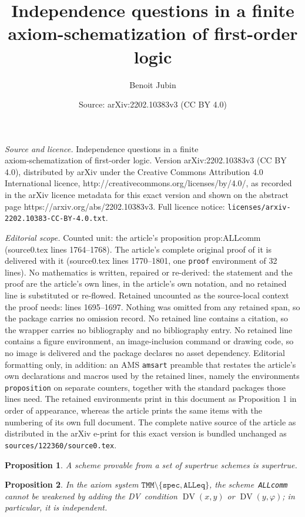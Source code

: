 \documentclass[10pt,a4paper]{amsart}
\title{Independence questions in a finite\\axiom-schematization of first-order logic}
\author{Benoit Jubin}
\date{Source: arXiv:2202.10383v3 (CC BY 4.0)}
\newtheorem{proposition}{Proposition}
\DeclareMathOperator{\DV}{DV}
\renewcommand*{\phi}{\varphi}
\begin{document}
\maketitle

\noindent\emph{Source and licence.} Independence questions in a finite\\axiom-schematization of first-order logic. Version arXiv:2202.10383v3 (CC BY 4.0), distributed by arXiv under the Creative Commons Attribution 4.0 International licence, http://creativecommons.org/licenses/by/4.0/, as recorded in the arXiv licence metadata for this exact version and shown on the abstract page https://arxiv.org/abs/2202.10383v3. Full licence notice: \texttt{licenses/arxiv-2202.10383-CC-BY-4.0.txt}.\par\smallskip

\noindent\textit{Editorial scope.} Counted unit: the article's proposition prop:ALLcomm (source0.tex lines 1764--1768). The article's complete original proof of it is delivered with it (source0.tex lines 1770--1801, one \texttt{proof} environment of 32 lines). No mathematics is written, repaired or re-derived: the statement and the proof are the article's own lines, in the article's own notation, and no retained line is substituted or re-flowed.  Retained uncounted as the source-local context the proof needs: lines 1695--1697.  Nothing was omitted from any retained span, so the package carries no omission record.  No retained line contains a citation, so the wrapper carries no bibliography and no bibliography entry.  No retained line contains a figure environment, an image-inclusion command or drawing code, so no image is delivered and the package declares no asset dependency.  Editorial formatting only, in addition: an AMS \texttt{amsart} preamble that restates the article's own declarations and macros used by the retained lines, namely the environments \texttt{proposition} on separate counters, together with the standard packages those lines need.  The retained environments print in this document as Proposition 1 in order of appearance, whereas the article prints the same items with the numbering of its own full document.  The complete native source of the article as distributed in the arXiv e-print for this exact version is bundled unchanged as \texttt{sources/122360/source0.tex}.
\begin{proposition}\label{prop:prov}
A scheme provable from a set of supertrue schemes is supertrue.
\end{proposition}

\begin{proposition}\label{prop:ALLcomm}
In the axiom system $\texttt{TMM} \setminus \{\texttt{spec}, \texttt{ALLeq} \}$, the
scheme~\texttt{ALLcomm} cannot be weakened by adding the DV~condition $\DV(x, y)$ or $\DV(y, \phi)$;
in particular, it is independent.
\end{proposition}
\end{document}
